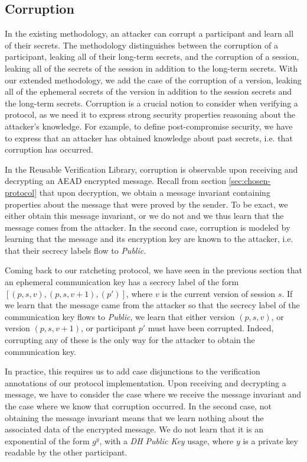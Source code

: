 \subsection{Corruption}

In the existing methodology, an attacker can corrupt a participant and learn all of their secrets.
The methodology distinguishes between the corruption of a participant, leaking all of their long-term secrets, and the corruption of a session, leaking all of the secrets of the session in addition to the long-term secrets.
With our extended methodology, we add the case of the corruption of a version, leaking all of the ephemeral secrets of the version in addition to the session secrets and the long-term secrets.
Corruption is a crucial notion to consider when verifying a protocol, as we need it to express strong security properties reasoning about the attacker's knowledge.
For example, to define post-compromise security, we have to express that an attacker has obtained knowledge about past secrets, i.e. that corruption has occurred.

In the Reusable Verification Library, corruption is observable upon receiving and decrypting an AEAD encrypted message. 
Recall from section \ref{sec:chosen-protocol} that upon decryption, we obtain a message invariant containing properties about the message that were proved by the sender.
To be exact, we either obtain this message invariant, or we do not and we thus learn that the message comes from the attacker.
In the second case, corruption is modeled by learning that the message and its encryption key are known to the attacker, i.e. that their secrecy labels flow to \emph{Public}.

Coming back to our ratcheting protocol, we have seen in the previous section that an ephemeral communication key has a secrecy label of the form $[(p,s,v),(p,s,v+1),(p')]$, where $v$ is the current version of session $s$.
If we learn that the message came from the attacker so that the secrecy label of the communication key flows to \emph{Public}, we learn that either version $(p,s,v)$, or version $(p,s,v+1)$, or participant $p'$ must have been corrupted.
Indeed, corrupting any of these is the only way for the attacker to obtain the communication key.

In practice, this requires us to add case disjunctions to the verification annotations of our protocol implementation.
Upon receiving and decrypting a message, we have to consider the case where we receive the message invariant and the case where we know that corruption occurred.
In the second case, not obtaining the message invariant means that we learn nothing about the associated data of the encrypted message. We do not learn that it is an exponential of the form $g^y$, with a \emph{DH Public Key} usage, where $y$ is a private key readable by the other participant.

